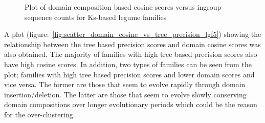 \documentclass{article}
\begin{document}
		\begin{figure}
			\caption{Plot of domain composition based cosine scores versus ingroup sequence counts for Ks-based legume families}
			\label{fig:scatter_domain_cosine_vs_seq_ct_lgf5}
		\end{figure}
		
		A plot (figure:~\ref{fig:scatter_domain_cosine_vs_tree_precision_lgf5}) showing the relationship between the tree based precision scores and domain cosine scores was also obtained. The majority of families with high tree based precision scores also have high cosine scores. In addition, two types of families can be seen from the plot; families with high tree based precision scores and lower domain scores and vice versa. The former are those that seem to evolve rapidly through domain insertion/deletion. The latter are those that seem to evolve slowly conserving domain compositions over longer evolutionary periods which could be the reason for the over-clustering.
		
\end{document}
